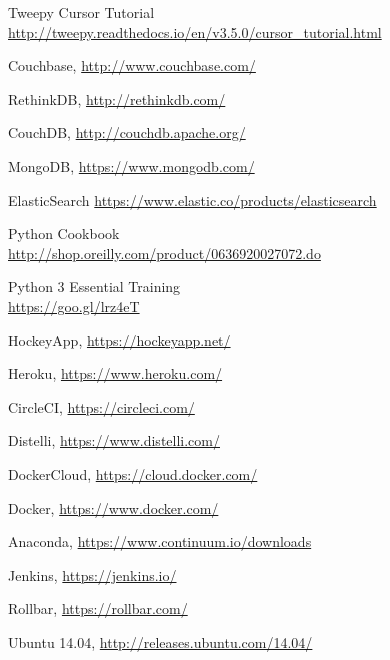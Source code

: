 \documentclass{article}
\begin{document}
\begin{thebibliography}{9}
    Tweepy Cursor Tutorial \\ 
    \phantom{ } \url{http://tweepy.readthedocs.io/en/v3.5.0/cursor_tutorial.html}

    Couchbase, \url{http://www.couchbase.com/}
    
    RethinkDB, \url{http://rethinkdb.com/}

    CouchDB, \url{http://couchdb.apache.org/}

    MongoDB, \url{https://www.mongodb.com/}

    ElasticSearch \url{https://www.elastic.co/products/elasticsearch}
    
    Python Cookbook \\
    \phantom{ } \url{http://shop.oreilly.com/product/0636920027072.do}
    
    Python 3 Essential Training \\
    \phantom{ } \url{https://goo.gl/lrz4eT}
    
    HockeyApp, \url{https://hockeyapp.net/}
    
    Heroku, \url{https://www.heroku.com/}
    
    CircleCI, \url{https://circleci.com/}
    
    Distelli, \url{https://www.distelli.com/}
    
    DockerCloud, \url{https://cloud.docker.com/}
    
    Docker, \url{https://www.docker.com/}

    Anaconda, \url{https://www.continuum.io/downloads}

    Jenkins, \url{https://jenkins.io/}

    Rollbar, \url{https://rollbar.com/}  
    
    Ubuntu 14.04, \url{http://releases.ubuntu.com/14.04/}    


    


\end{thebibliography}


\newpage
\end{document}
